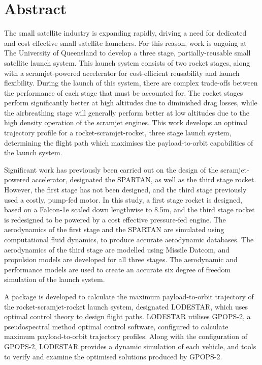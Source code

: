 \cleardoublepage

\section*{Abstract}

 The small satellite industry is expanding rapidly, driving a need for dedicated and cost effective small satellite launchers.  
 For this reason, work is ongoing at The University of Queensland to develop a three stage, partially-reusable small satellite launch system. This launch system consists of two rocket stages, along with a scramjet-powered accelerator for cost-efficient reusability and launch flexibility.
During the launch of this system, there are complex trade-offs between the performance of each stage that must be accounted for. The rocket stages perform significantly better at high altitudes due to diminished drag losses, while the airbreathing stage will generally perform better at low altitudes due to the high density operation of the scramjet engines. 
 This work develops an optimal trajectory profile for a rocket-scramjet-rocket, three stage launch system, determining the flight path which maximises the payload-to-orbit capabilities of the launch system. 
 
 Significant work has previously been carried out on the design of the scramjet-powered accelerator, designated the SPARTAN, as well as the third stage rocket. 
 However, the first stage has not been designed, and the third stage previously used a costly, pump-fed motor. 
 In this study, a first stage rocket is designed, based on a Falcon-1e scaled down lengthwise to 8.5m, and the third stage rocket is redesigned to be powered by a cost effective pressure-fed engine. 
 The aerodynamics of the first stage and the SPARTAN are simulated using computational fluid dynamics, to produce accurate aerodynamic databases. 
 The aerodynamics of the third stage are modelled using Missile Datcom, and propulsion models are developed for all three stages. The aerodynamic and performance models are used to create an accurate six degree of freedom simulation of the launch system. 
 
 A package is developed to calculate the maximum payload-to-orbit trajectory of the rocket-scramjet-rocket launch system, designated LODESTAR, which uses optimal control theory to design flight paths. LODESTAR utilises GPOPS-2, a pseudospectral method optimal control software, configured to calculate maximum payload-to-orbit trajectory profiles. Along with the configuration of GPOPS-2, LODESTAR provides a dynamic simulation of each vehicle, and tools to verify and examine the optimised solutions produced by GPOPS-2. 
 
